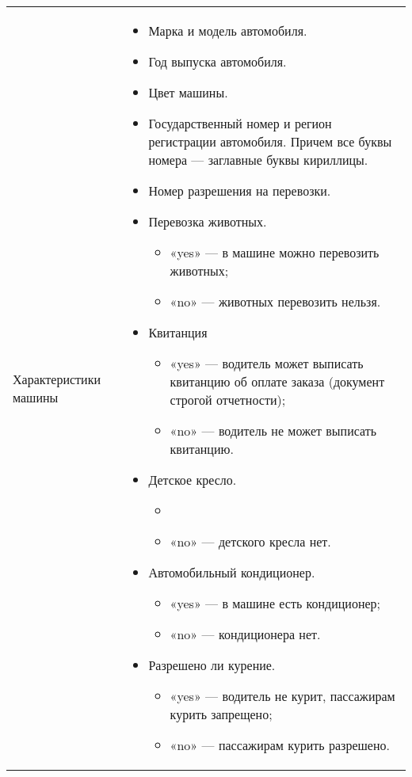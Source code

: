 \begin{longtable}{|p{4cm}|p{9cm}|}
					\hline	Характеристики машины & \begin{itemize} 
														\item Марка и модель автомобиля.
														\item Год выпуска автомобиля.
														\item Цвет машины.
														\item Государственный номер и регион регистрации автомобиля. Причем все буквы номера — заглавные буквы кириллицы.
														\item Номер разрешения на перевозки.
														\item Перевозка животных.
															\begin{itemize} 
																\item «yes» — в машине можно перевозить животных;
																\item «no» — животных перевозить нельзя.
															\end{itemize} 
														\item Квитанция
															\begin{itemize} 
																\item «yes» — водитель может выписать квитанцию об оплате заказа (документ строгой отчетности);
																\item «no» — водитель не может выписать квитанцию.
															\end{itemize}
														\item Детское кресло.
															\begin{itemize} 
																\item <возраст ребенка>
																\item «no» — детского кресла нет.
															\end{itemize}
														\item Автомобильный кондиционер.
															\begin{itemize} 
																\item «yes» — в машине есть кондиционер;
																\item «no» — кондиционера нет.
															\end{itemize}
														\item Разрешено ли курение.
															\begin{itemize} 
																\item «yes» — водитель не курит, пассажирам курить запрещено;
																\item «no» — пассажирам курить разрешено.

\end{itemize}
\end{itemize}
\end{longtable}

